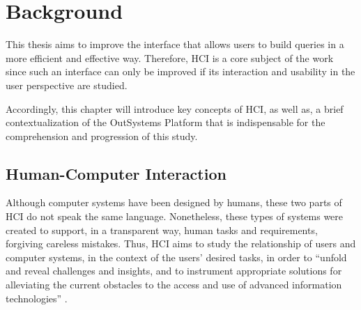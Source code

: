 \chapter{Background}
\label{cha:background}
This thesis aims to improve the interface that allows users to build queries in a more efficient and effective way. Therefore, \gls{HCI} is a core subject of the work since such an interface can only be improved if its interaction and usability in the user perspective are studied.

Accordingly, this chapter will introduce key concepts of \gls{HCI}, as well as, a brief contextualization of the OutSystems Platform that is indispensable for the comprehension and progression of this study.

\section{Human-Computer Interaction}
\label{sec:human_computer_interaction}
Although computer systems have been designed by humans, these two parts of \gls{HCI} do not speak the same language. Nonetheless, these types of systems were created to support, in a transparent way, human tasks and requirements, forgiving careless mistakes. \cite{humanComputerInteraction} Thus, \gls{HCI} aims to study the relationship of users and computer systems, in the context of the users’ desired tasks, in order to “unfold and reveal challenges and insights, and to instrument appropriate solutions for alleviating the current obstacles to the access and use of advanced information technologies” \cite{userInterfacesForAll_newPerspectivesIntoHumanComputerInteraction}. 




